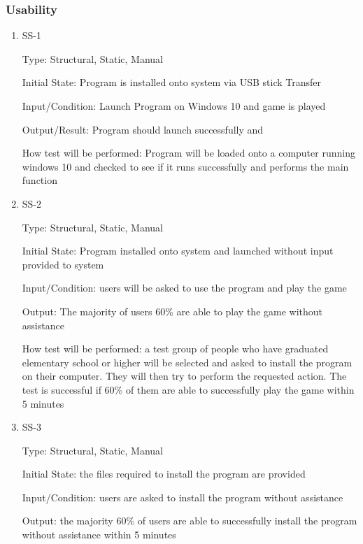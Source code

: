 \documentclass[12pt, titlepage]{article}
\begin{document}
\subsubsection{Usability}
		
\begin{enumerate}

\item{SS-1\\}
\label{nfr:ss-1}

Type: Structural, Static, Manual
					
Initial State: Program is installed onto system via USB stick Transfer
					
Input/Condition: Launch Program on Windows 10 and game is played
					
Output/Result: Program should launch successfully and 
					
How test will be performed: Program will be loaded onto a computer running windows 10 and checked to see if it runs successfully and performs the main function  
					
\item{SS-2\\}
\label{nfr:ss-2}

Type: Structural, Static, Manual
					
Initial State: Program installed onto system and launched without input provided to system
					
Input/Condition: users will be asked to use the program and play the game
					
Output: The majority of users 60\% are able to play the game without assistance
					
How test will be performed: a test group of people who have graduated elementary school or higher will be selected and asked to install the program on their computer. They will then try to perform the requested action. The test is successful if 60\% of them are able to successfully play the game within 5 minutes

\item{SS-3\\}
\label{nfr:ss-3}

Type: Structural, Static, Manual
					
Initial State: the files required to install the program are provided
					
Input/Condition: users are asked to install the program without assistance
					
Output: the majority 60\% of users are able to successfully install the program without assistance within 5 minutes
					

\end{enumerate}
\end{document}
